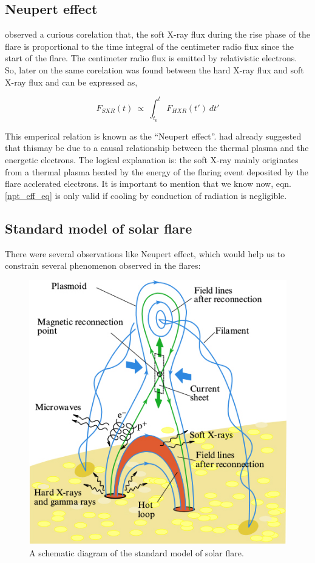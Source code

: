 \subsection{Neupert effect}\label{npt_eff}

\cite{neupert68} observed a curious corelation that, the soft X-ray flux during the rise phase of the flare is proportional to the time integral of the centimeter radio flux since the start of the flare. The centimeter radio flux is emitted by relativistic electrons. So, later on the same corelation was found between the hard X-ray flux and soft X-ray flux and can be expressed as,

\begin{equation}\label{npt_eff_eq}
    F_{SXR}(t)~\propto~\int_{t_{0}}^{t}~F_{HXR}(t')~dt'
\end{equation}

This emperical relation is known as the ``Neupert effect''. \cite{neupert68} had already suggested that thismay be due to a causal relationship between the thermal plasma and the energetic electrons. The logical explanation is: the soft X-ray mainly originates from a thermal plasma heated by the energy of the flaring event deposited by the flare acclerated electrons. It is important to mention that we know now, eqn.\ref{npt_eff_eq} is only valid if cooling by conduction of radiation is negligible.

\subsection{Standard model of solar flare}\label{sol_flr_std_mod}

There were several observations like Neupert effect, which would help us to constrain several phenomenon observed in the flares:

\begin{figure}[h!]
    \centering
    \includegraphics[width=0.5\linewidth]{Figures/phu_63_8_818_f2.jpg}
    \caption{A schematic diagram of the standard model of solar flare.}
\end{figure}

